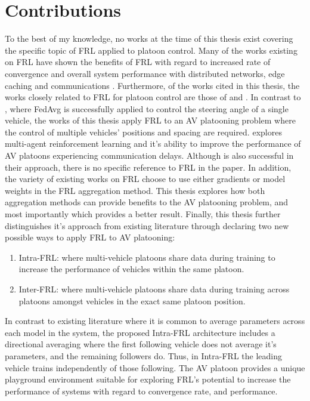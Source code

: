 \section{Contributions}
To the best of my knowledge, no works at the time of this thesis exist covering the
specific topic of FRL applied to platoon control. Many of the works existing on FRL
have shown the benefits of FRL with regard to increased rate of convergence and overall
system performance with distributed networks, edge caching and communications
\cite{ZhangX2020, LimHyun2021, WangXiaofei2021, Huang2021}.  Furthermore, of the works
cited in this thesis, the works closely related to FRL for platoon control are those of
\cite{Peake2020} and \cite{Liang2019}.  In contrast to \cite{Liang2019}, where FedAvg
is successfully applied to control the steering angle of a single vehicle,
the works of this thesis apply FRL to an AV platooning problem where the control of multiple vehicles' positions and
spacing are required.  \cite{Peake2020} explores multi-agent reinforcement learning
and it's ability to improve the performance of AV platoons experiencing communication delays.
Although \cite{Peake2020} is also successful in their approach, there is no specific
reference to FRL in the paper. In addition, the variety of existing works on FRL
choose to use either gradients or model weights in the FRL aggregation method.
This thesis explores how both aggregation methods can provide benefits to the AV
platooning problem, and most importantly which provides a better result. Finally, this
thesis further distinguishes it's approach from existing literature through declaring two
new possible ways to apply FRL to AV platooning:

\begin{enumerate}
    \item Intra-FRL: where multi-vehicle platoons share data during training to increase
    the performance of vehicles within the same platoon.
    \item Inter-FRL: where multi-vehicle platoons share data during training across
    platoons amongst vehicles in the exact same platoon position.
\end{enumerate}

In contrast to existing literature where it is common to average parameters
across each model in the system, the proposed Intra-FRL architecture includes
a directional averaging where
the first following vehicle does not average it's parameters, and the remaining
followers do. Thus, in Intra-FRL the leading vehicle trains independently of those
following. The AV platoon provides a unique playground environment suitable for
exploring FRL's potential to increase the performance of systems with regard to
convergence rate, and performance.

